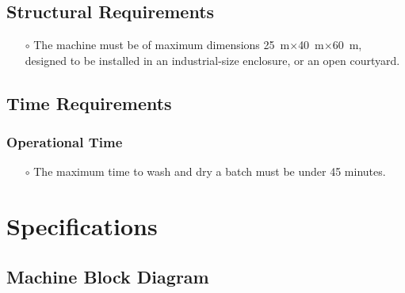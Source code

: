 \documentclass[12pt]{article}
\begin{document}
\subsection{Structural Requirements}
\begin{itemize}
    \item[$\scriptstyle\circ$] The machine must be of maximum dimensions \SI{25}{\meter}$\times$\SI{40}{\meter}$\times$\SI{60}{\meter}, designed to be installed in an industrial-size enclosure, or an open courtyard. 
\end{itemize}
\subsection{Time Requirements}
\subsubsection{Operational Time}
    \begin{itemize}
        \item[$\scriptstyle\circ$] The maximum time to wash and dry a batch must be under 45 minutes. 
    \end{itemize}





\newpage

% 

\section{Specifications}
\subsection{Machine Block Diagram}
\end{document}
